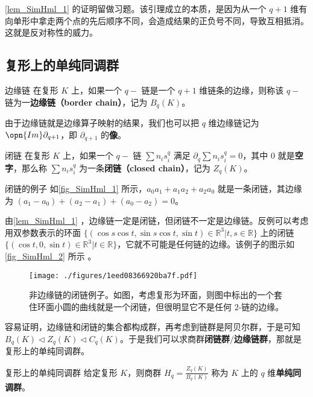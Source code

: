 \autoref{lem_SimHml_1} 的证明留做习题。该引理成立的本质，是因为从一个 $q+1$ 维有向单形中拿走两个点的先后顺序不同，会造成结果的正负号不同，导致互相抵消。这就是反对称性的威力。


\subsection{复形上的单纯同调群}


\begin{definition}{边缘链}
在复形 $K$ 上，如果一个 $q-$ 链是一个 $q+1$ 维链条的边缘，则称该 $q-$ 链为一\textbf{边缘链（border chain）}，记为 $B_q(K)$。
\end{definition}

由于边缘链就是边缘算子映射的结果，我们也可以把 $q$ 维边缘链记为 $\opn{Im}\partial_{q+1}$，即 $\partial_{q+1}$ 的\textbf{像}。

\begin{definition}{闭链}
在复形 $K$ 上，如果一个 $q-$ 链 $\sum n_is^q_i$ 满足 $\partial_q\sum n_is^q_i=0$，其中 $0$ 就是\textbf{空字}，那么称 $\sum n_is^q_i$ 为一条\textbf{闭链（closed chain）}，记为 $Z_q(K)$。
\end{definition}

\begin{example}{闭链的例子}
如\autoref{fig_SimHml_1} 所示，$a_0a_1+a_1a_2+a_2a_0$ 就是一条闭链，其边缘为 $(a_1-a_0)+(a_2-a_1)+(a_0-a_2)=0$。
\end{example}

由\autoref{lem_SimHml_1} ，边缘链一定是闭链，但闭链不一定是边缘链。反例可以考虑用双参数表示的环面 $\{(\cos s\cos t, \sin s\cos t, \sin t)\in\mathbb{R}^3|t, s\in\mathbb{R}\}$ 上的闭链 $\{(\cos t, 0, \sin t)\in\mathbb{R}^3|t\in\mathbb{R}\}$，它就不可能是任何链的边缘。该例子的图示如\autoref{fig_SimHml_2} 所示 。


\begin{figure}[ht]
\centering
\texttt{[image: ./figures/1eed08366920ba7f.pdf]}
\caption{非边缘链的闭链例子。如图，考虑复形为环面，则图中标出的一个套住环面小圆的曲线就是一个闭链，但很明显它不是任何 $2$-链的边缘。} \label{fig_SimHml_2}
\end{figure}




容易证明，边缘链和闭链的集合都构成群，再考虑到链群是阿贝尔群，于是可知 $B_q(K)\triangleleft Z_q(K)\triangleleft C_q(K)$。于是我们可以求商群\textbf{闭链群}$/$\textbf{边缘链群}，那就是复形上的单纯同调群。


\begin{definition}{复形上的单纯同调群}
给定复形 $K$，则商群 $H_q=\frac{Z_q(K)}{B_q(K)}$ 称为 $K$ 上的 $q$ 维\textbf{单纯同调群}。
\end{definition}
